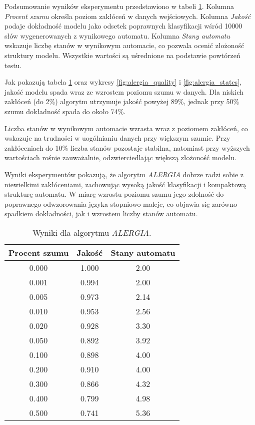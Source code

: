 Podsumowanie wyników eksperymentu przedstawiono w tabeli \ref{tab:alergia_results}. Kolumna \textit{Procent szumu} określa poziom zakłóceń w danych wejściowych. Kolumna \textit{Jakość} podaje dokładność modelu jako odsetek poprawnych klasyfikacji wśród 10000 słów wygenerowanych z wynikowego automatu. Kolumna \textit{Stany automatu} wskazuje liczbę stanów w wynikowym automacie, co pozwala ocenić złożoność struktury modelu. Wszystkie wartości są uśrednione na podstawie powtórzeń testu.

Jak pokazują tabela \ref{tab:alergia_results} oraz wykresy \ref{fig:alergia_quality} i \ref{fig:alergia_states}, jakość modelu spada wraz ze wzrostem poziomu szumu w danych. Dla niskich zakłóceń (do 2\%) algorytm utrzymuje jakość powyżej 89\%, jednak przy 50\% szumu dokładność spada do około 74\%.  

Liczba stanów w wynikowym automacie wzrasta wraz z poziomem zakłóceń, co wskazuje na trudności w uogólnianiu danych przy większym szumie. Przy zakłóceniach do 10\% liczba stanów pozostaje stabilna, natomiast przy wyższych wartościach rośnie zauważalnie, odzwierciedlając większą złożoność modelu.

Wyniki eksperymentów pokazują, że algorytm \textit{ALERGIA} dobrze radzi sobie z niewielkimi zakłóceniami, zachowując wysoką jakość klasyfikacji i kompaktową strukturę automatu. W miarę wzrostu poziomu szumu jego zdolność do poprawnego odwzorowania języka stopniowo maleje, co objawia się zarówno spadkiem dokładności, jak i wzrostem liczby stanów automatu.

\begin{table}[h]
\centering
\caption{Wyniki dla algorytmu \textit{ALERGIA}.}
\label{tab:alergia_results}
\begin{tabular}{|c|c|c|}
\hline
Procent szumu & Jakość & Stany automatu \\ \hline
\num{0.000}  & \num{1.000} & \num{2.00}         \\ \hline
\num{0.001}  & \num{0.994} & \num{2.00}         \\ \hline
\num{0.005}  & \num{0.973} & \num{2.14}         \\ \hline
\num{0.010}  & \num{0.953} & \num{2.56}         \\ \hline
\num{0.020}  & \num{0.928} & \num{3.30}         \\ \hline
\num{0.050}  & \num{0.892} & \num{3.92}         \\ \hline
\num{0.100}  & \num{0.898} & \num{4.00}         \\ \hline
\num{0.200}  & \num{0.910} & \num{4.00}         \\ \hline
\num{0.300}  & \num{0.866} & \num{4.32}         \\ \hline
\num{0.400}  & \num{0.799} & \num{4.98}         \\ \hline
\num{0.500}  & \num{0.741} & \num{5.36}         \\ \hline
\end{tabular}
\end{table}

